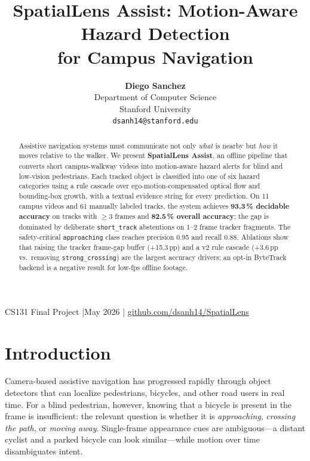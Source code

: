\documentclass[10pt,twocolumn,letterpaper]{article}
\title{\Large\textbf{SpatialLens Assist: Motion-Aware Hazard Detection\\for Campus Navigation}}
\author{%
  \textbf{Diego Sanchez} \\
  Department of Computer Science \\
  Stanford University \\
  \texttt{dsanh14@stanford.edu}
}
\date{}
\begin{document}
\maketitle
\vspace{-0.8em}
\begin{center}
\small
CS131 Final Project \quad|\quad May 2026 \quad|\quad
\href{https://github.com/dsanh14/SpatialLens}{github.com/dsanh14/SpatialLens}
\end{center}
\vspace{0.4em}

\begin{abstract}
Assistive navigation systems must communicate not only \emph{what} is nearby but \emph{how} it moves relative to the walker. We present \textbf{SpatialLens Assist}, an offline pipeline that converts short campus-walkway videos into motion-aware hazard alerts for blind and low-vision pedestrians. Each tracked object is classified into one of six hazard categories using a rule cascade over ego-motion-compensated optical flow and bounding-box growth, with a textual evidence string for every prediction. On 11 campus videos and 61 manually labeled tracks, the system achieves \textbf{93.3\,\% decidable accuracy} on tracks with $\ge$3 frames and \textbf{82.5\,\% overall accuracy}; the gap is dominated by deliberate \texttt{short\_track} abstentions on 1--2 frame tracker fragments. The safety-critical \texttt{approaching} class reaches precision 0.95 and recall 0.88. Ablations show that raising the tracker frame-gap buffer (+15.3\,pp) and a v2 rule cascade (+3.6\,pp vs.\ removing \texttt{strong\_crossing}) are the largest accuracy drivers; an opt-in ByteTrack backend is a negative result for low-fps offline footage.
\end{abstract}

\section{Introduction}

Camera-based assistive navigation has progressed rapidly through object detectors that can localize pedestrians, bicycles, and other road users in real time. For a blind pedestrian, however, knowing that a bicycle is present in the frame is insufficient: the relevant question is whether it is \emph{approaching}, \emph{crossing the path}, or \emph{moving away}. Single-frame appearance cues are ambiguous---a distant cyclist and a parked bicycle can look similar---while motion over time disambiguates intent.
\end{document}
